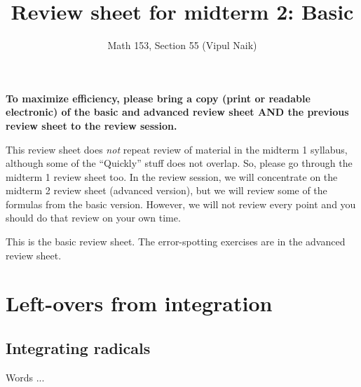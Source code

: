 \documentclass[10pt]{amsart}
\title{Review sheet for midterm 2: Basic}
\author{Math 153, Section 55 (Vipul Naik)}
\begin{document}
\maketitle

{\bf To maximize efficiency, please bring a copy (print or readable
electronic) of the basic and advanced review sheet AND the previous
review sheet to the review session.}

This review sheet does {\em not} repeat review of material in the
midterm 1 syllabus, although some of the ``Quickly'' stuff does not
overlap. So, please go through the midterm 1 review sheet too. In the
review session, we will concentrate on the midterm 2 review sheet
(advanced version), but we will review some of the formulas from the
basic version. However, we will not review every point and you should
do that review on your own time.

This is the basic review sheet. The error-spotting exercises are in
the advanced review sheet.
\section{Left-overs from integration}

\subsection{Integrating radicals}
Words ...
\end{document}
